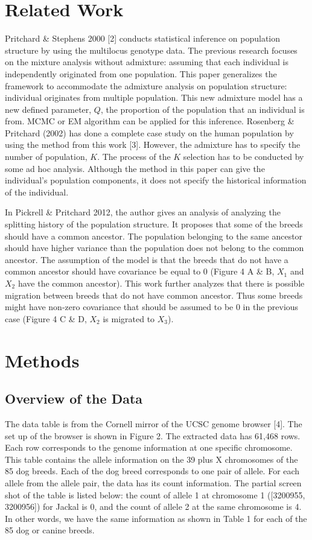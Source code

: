 \documentclass{article} %
\begin{document}
\section{Related Work}

Pritchard \& Stephens 2000 [2] conducts statistical inference on population structure by using the multilocus genotype data. The previous research focuses on the mixture analysis without admixture: assuming that each individual is independently originated from one population. This paper generalizes the framework to accommodate the admixture analysis on population structure: individual originates from multiple population. This new admixture model has a new defined parameter, $Q$, the proportion of the population that an individual is from. MCMC or EM algorithm can be applied for this inference. Rosenberg \& Pritchard (2002) has done a complete case study on the human population by using the method from this work [3]. However, the admixture has to specify the number of population, $K$. The process of the $K$ selection has to be conducted by some ad hoc analysis. Although the method in this paper can give the individual's population components, it does not specify the historical information of the individual. 

In Pickrell \& Pritchard 2012, the author gives an analysis of analyzing the splitting history of the population structure. It proposes that some of the breeds should have a common ancestor. The population belonging to the same ancestor should have higher variance than the population does not belong to the common ancestor. The assumption of the model is that the breeds that do not have a common ancestor should have covariance be equal to 0 (Figure 4 A \& B, $X_1$ and $X_2$ have the common ancestor). This work further analyzes that there is possible migration between breeds that do not have common ancestor. Thus some breeds might have non-zero covariance that should be assumed to be 0 in the previous case (Figure 4 C \& D, $X_2$ is migrated to $X_3$).

\section{Methods}

\subsection{Overview of the Data}

The data table is from the Cornell mirror of the UCSC genome browser [4]. The set up of the browser is shown in Figure 2. The extracted data has 61,468 rows. Each row corresponds to the genome information at one specific chromosome. This table contains the allele information on the 39 plus X chromosomes of the 85 dog breeds. Each of the dog breed corresponds to one pair of allele. For each allele from the allele pair, the data has its count information. The partial screen shot of the table is listed below: the count of allele 1 at chromosome 1 ([3200955, 3200956]) for Jackal is 0, and the count of allele 2 at the same chromosome is 4. In other words, we have the same information as shown in Table 1 for each of the 85 dog or canine breeds.
\end{document}
